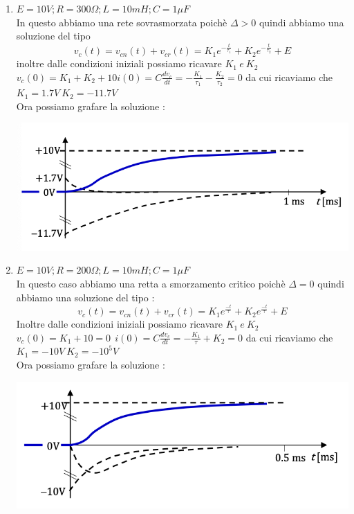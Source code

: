 \documentclass{article}
\theoremstyle{definition}
\begin{document}
\begin{enumerate}
\item$E=10V ; R=300\Omega ;L=10 mH;C=1\mu F$\\
In questo abbiamo una rete sovrasmorzata poichè $\Delta > 0 $ quindi abbiamo una soluzione del tipo 
$$v_c(t)=v_{cn}(t)+v_{cr}(t)=K_1e^{-\frac{t}{\tau_1}}+K_2e^{-\frac{t}{\tau_2}}+E$$ inoltre dalle condizioni iniziali possiamo ricavare $K_1 \ e \ K_2$ \\
	$v_c(0)=K_1+K_2+10  i(0)=C\frac{dv_c}{dt}=-\frac{K_1}{\tau_1}-\frac{K_2}{\tau_2}=0$ da cui ricaviamo che $K_1=1.7V \ K_2=-11.7 V$ \\
	Ora possiamo grafare la soluzione :
	\begin{center}
\includegraphics[scale=0.40]{immagini/sovra}
	\end{center}
\item $E=10V ; R=200\Omega ;L=10 mH;C=1\mu F$\\
In questo caso abbiamo una retta a smorzamento critico poichè $\Delta =0$
quindi abbiamo una soluzione del tipo : 
$$v_c(t)=v_{cn}(t)+v_{cr}(t)=K_1e^{\frac{-t}{\tau}}+K_2e^{\frac{-t}{\tau}} +E$$
Inoltre dalle condizioni iniziali possiamo ricavare $K_1 \ e \ K_2$ \\
$v_c(0)=K_1+10=0 \ \  i(0)=C\frac{dv_c}{dt}=-\frac{K_1}{\tau}+K_2=0$ da cui ricaviamo che $K_1=-10V \ K_2=-10^5 V$ \\
Ora possiamo grafare la soluzione :
\begin{center}
	\includegraphics[scale=0.40]{immagini/critico}

\end{center}
\end{enumerate}
\end{document}
